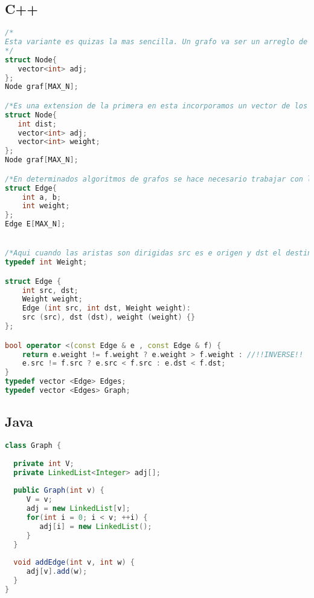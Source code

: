 \subsection{C++}

\begin{lstlisting}[language=C++]
/*
Esta variante es quizas la mas sencilla. Un grafo va ser un arreglo de una estructura llamada Node la cual tiene como atributo un vector con los indices de los nodos adyacentes al nodo almacenado en la posicion inesima del arreglo. La definicion de MAX\_N debe ser un valor igual o mayor que la cantidad de nodos del grafo que vas a representar con esta variante. Es muy utilizada cuando realizamos BFS y DFS.
*/
struct Node{
   vector<int> adj;
};
Node graf[MAX_N];

/*Es una extension de la primera en esta incorporamos un vector de los pesos de las aristas de los nodos adyacentes. Otra adecuacion es la variable dist que almacenara la distancia minima existen entre un nodo X y el que ocupa la posicion inesima. Esta variante es muy utilizada para un Dijkstra.*/
struct Node{
   int dist;
   vector<int> adj;
   vector<int> weight;
};
Node graf[MAX_N];

/*En determinados algoritmos de grafos se hace necesario trabajar con las aristas del grafo y para este elemento tambien podemos representarlo mediante la siguiente estructura. En este caso las variables a y b de la estructura son los nodos que componen la aristas mientras la variable weight contiene el valor de la aristas. E es el arreglo de las aristas del grafo mientras MAX\_N tiene que ser definida con valor igual o mayor a la cantidad de aristas del grafos.*/
struct Edge{
	int a, b;
	int weight;
};
Edge E[MAX_N];


/*Aqui cuando las aristas son dirigidas src es e origen y dst el destino*/
typedef int Weight;

struct Edge {
	int src, dst;
	Weight weight;
	Edge (int src, int dst, Weight weight):
	src (src), dst (dst), weight (weight) {}
};

bool operator <(const Edge & e , const Edge & f) {
	return e.weight != f.weight ? e.weight > f.weight : //!!INVERSE!!
	e.src != f.src ? e.src < f.src : e.dst < f.dst;
}
typedef vector <Edge> Edges;
typedef vector <Edges> Graph;
\end{lstlisting}

\subsection{Java}

\begin{lstlisting}[language=Java]
class Graph {
	
  private int V;
  private LinkedList<Integer> adj[];
	
  public Graph(int v) {
     V = v;
     adj = new LinkedList[v];
     for(int i = 0; i < v; ++i) {
        adj[i] = new LinkedList();
     }
  }
	
  void addEdge(int v, int w) {
     adj[v].add(w);
  }
}
\end{lstlisting}